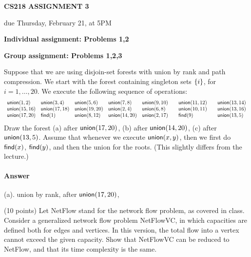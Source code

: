 \documentclass[11pt]{article}
\newcommand{\Union}{\mbox{\sf union}}
\newcommand{\Find}{\mbox{\sf find}}
\begin{document}
\centerline{\large \bf CS218 ASSIGNMENT 3}
\centerline{due Thursday, February 21, at 5PM}

\vskip 0.3in
\noindent
{\bf Individual assignment: Problems 1,2}

\noindent
{\bf Group assignment: Problems 1,2,3}

\vskip 0.2in




\begin{problem}
Suppose that we are using disjoin-set forests with
union by rank and path compression. We start with
the forest containing singleton sets ${\left\{ i \right\} }$,
for $i = 1,\dots,20$. We execute the following
sequence of operations:
%
\noindent
{\small
\begin{eqnarray*}
\begin{array}{lllllll}
\Union(1,2)\quad & \Union(3,4)\quad &\Union(5,6) \quad
    &\Union(7,8)\quad & \Union(9,10) \quad & \Union(11,12)\quad &\Union(13,14) \\
%
\Union(15,16) & \Union(17,18) &\Union(19,20) & \Union(2,4) & \Union(6,8) 
 	& \Union(10,11) & \Union(13,16) \\
%
 \Union(17,20) 	&  \Find(1) & \Union(8,12)  & \Union(14, 20)
	 & \Union(2,17) & \Find(9) &  \Union(13,5)
\end{array}
\end{eqnarray*}
}
%
Draw the forest (a) after $\Union(17,20)$, (b) after
$\Union(14,20)$, (c) after $\Union(13,5)$.
Assume that whenever we execute $\Union(x,y)$, then we
first do $\Find(x)$, $\Find(y)$, and then the union for the roots.
(This slightly differs from the lecture.)
\end{problem}

\paragraph{Answer}
(a). union by rank, after $\Union(17,20)$,



\begin{problem} (10 points)
Let {\sf NetFlow} stand for the network flow problem,
as covered in class.
Consider a generalized network flow problem
{\sf NetFlowVC}, in which
capacities are defined both for edges and vertices.
In this version, the total flow into a vertex cannot
exceed the given capacity. Show that {\sf NetFlowVC}
can be reduced to {\sf NetFlow}, and that its
time complexity is the same.
\end{problem}
\end{document}
